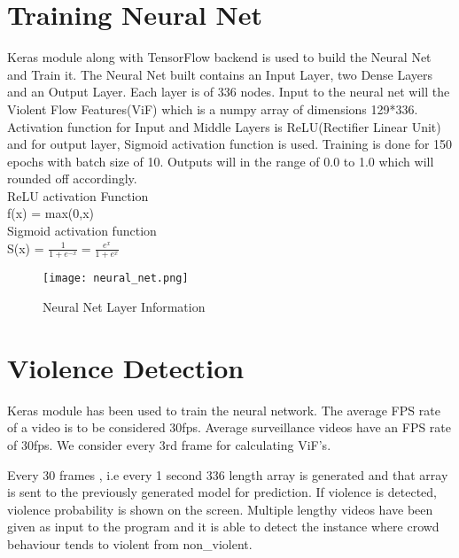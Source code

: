 \section{Training Neural Net}
Keras module along with TensorFlow backend is used to build the Neural Net and Train it. The Neural Net built contains an Input Layer, two Dense Layers and an Output Layer. Each layer is of 336 nodes. Input to the neural net will the Violent Flow Features(ViF) which is a numpy array of dimensions 129*336. Activation function for Input and Middle Layers is ReLU(Rectifier Linear Unit) and for output layer, Sigmoid activation function is used. Training is done for 150 epochs with batch size of 10. Outputs will in the range of 0.0 to 1.0 which will rounded off accordingly. \\
ReLU activation Function \\
f(x) = max(0,x)\\
Sigmoid activation function \\
S(x) = $\frac{1}{1+e^{-x}} = \frac{e^x}{1+e^x}$
\begin{center}
\begin{figure}[H]
\centering
\texttt{[image: neural\_net.png]}
\caption{Neural Net Layer Information}
\end{figure}
\end{center}
\section{Violence Detection}
Keras module has been used to train the neural network. The average FPS rate of a video is to be considered 30fps. Average surveillance videos have an FPS rate of 30fps. We consider every 3rd frame for calculating ViF’s. 
\par
	Every 30 frames , i.e every 1 second 336 length array is generated and that array is sent to the previously generated model for prediction. If violence is detected, violence probability is shown on the screen. Multiple lengthy videos have been given as input to the program and it is able to detect the instance where crowd behaviour tends to violent from non\_violent.



